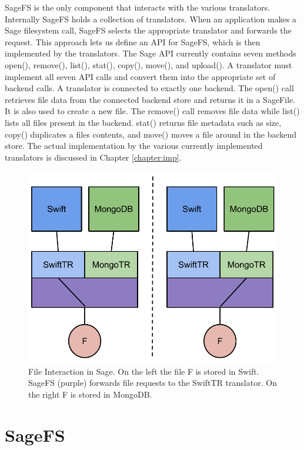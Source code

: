 SageFS is the only component that interacts with the various translators. Internally SageFS holds a collection of translators. When an application makes a Sage filesystem call, SageFS selects the appropriate translator and forwards the request. This approach lets us define an API for SageFS, which is then implemented by the translators. The Sage API currently contains seven methods open(), remove(), list(), stat(), copy(), move(), and upload(). A translator must implement all seven API calls and convert them into the appropriate set of backend calls. A translator is connected to exactly one backend. The open() call retrieves file data from the connected backend store and returns it in a SageFile. It is also used to create a new file. The remove() call removes file data while list() lists all files present in the backend. stat() returns file metadata such as size, copy() duplicates a files contents, and move() moves a file around in the backend store. The actual implementation by the various currently implemented translators is discussed in Chapter \ref{chapter:imp}.

\begin{figure}[h!]
\centering
\includegraphics[scale=0.7]{figures/sagecommunication}
\caption[File Interaction in Sage]{File Interaction in Sage. On the left the file F is stored in Swift. SageFS (purple) forwards file requests to the SwiftTR translator. On the right F is stored in MongoDB.}
\label{fig:sagecommunication}
\end{figure}


\section{SageFS}

